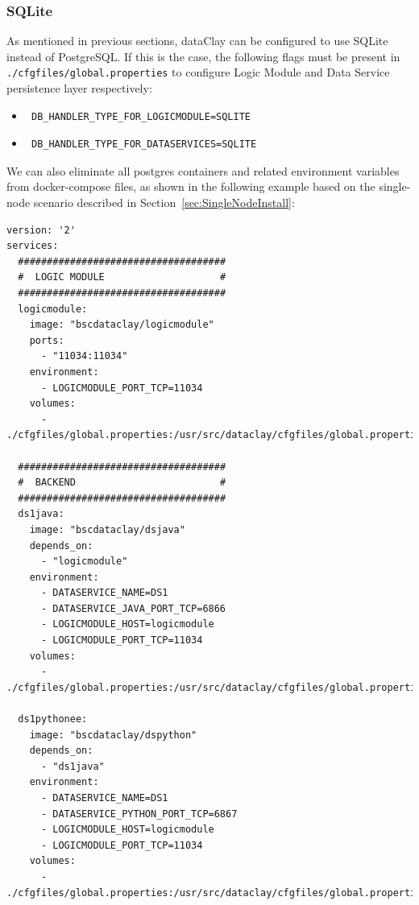 \subsubsection{SQLite}
\label{sec:SQLiteConf}

As mentioned in previous sections, dataClay can be configured to use SQLite instead of PostgreSQL. If this is the case, the following flags must be present in \texttt{./cfgfiles/global.properties} to configure Logic Module and Data Service persistence layer respectively:

\begin{itemize}
 \item \begin{verbatim} DB_HANDLER_TYPE_FOR_LOGICMODULE=SQLITE \end{verbatim}
 \item \begin{verbatim} DB_HANDLER_TYPE_FOR_DATASERVICES=SQLITE \end{verbatim}
\end{itemize}

We can also eliminate all postgres containers and related environment variables from docker-compose files, as shown in the following example based on the single-node scenario described in Section~\ref{sec:SingleNodeInstall}:

\begin{tBox}
 \begin{lstlisting}[language=docker-compose-2, frame=none]
version: '2' 
services:
  ####################################
  #  LOGIC MODULE                    #
  ####################################
  logicmodule:
    image: "bscdataclay/logicmodule"
    ports:
      - "11034:11034"
    environment:
      - LOGICMODULE_PORT_TCP=11034
    volumes:
      - ./cfgfiles/global.properties:/usr/src/dataclay/cfgfiles/global.properties

  ####################################
  #  BACKEND                         #
  ####################################
  ds1java:
    image: "bscdataclay/dsjava"
    depends_on:
      - "logicmodule"
    environment:
      - DATASERVICE_NAME=DS1
      - DATASERVICE_JAVA_PORT_TCP=6866
      - LOGICMODULE_HOST=logicmodule
      - LOGICMODULE_PORT_TCP=11034
    volumes:
      - ./cfgfiles/global.properties:/usr/src/dataclay/cfgfiles/global.properties

  ds1pythonee:
    image: "bscdataclay/dspython"
    depends_on:
      - "ds1java"
    environment:
      - DATASERVICE_NAME=DS1
      - DATASERVICE_PYTHON_PORT_TCP=6867
      - LOGICMODULE_HOST=logicmodule
      - LOGICMODULE_PORT_TCP=11034     
    volumes:
      - ./cfgfiles/global.properties:/usr/src/dataclay/cfgfiles/global.properties
 \end{lstlisting}
\end{tBox}


